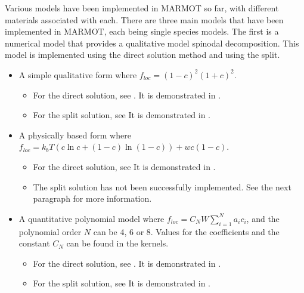 \documentclass[letter,12pt,fleqn]{article}
\begin{document}
Various models have been implemented in MARMOT so far, with different materials associated with each. There are three main models that have been implemented in MARMOT, each being single species models. The first is a numerical model that provides a qualitative model spinodal decomposition. This model is implemented using the direct solution method and using the split.  
\begin{itemize}
	\item A simple qualitative form where $f_{loc} = (1 - c)^2(1 + c)^2$.
	\begin{itemize}\sloppy
		\item For the direct solution, see . It is demonstrated in .
		\item For the split solution, see  It is demonstrated in .
	\end{itemize}
	\item A physically based form where $f_{loc} = k_b T(c\ln c + (1-c)\ln(1-c)) + w c (1-c)$.
	\begin{itemize}
		\item For the direct solution, see  It is demonstrated in .
		\item The split solution has not been successfully implemented. See the next paragraph for more information.
	\end{itemize}
	\item A quantitative polynomial model where $f_{loc} = C_N W \sum_{i=1}^N a_i c_i$, and the polynomial order $N$ can be 4, 6 or 8. Values for the coefficients and the constant $C_N$ can be found in the kernels.
	\begin{itemize}\sloppy
		\item For the direct solution, see . It is demonstrated in .
		\item For the split solution, see  It is demonstrated in .
	\end{itemize}
\end{itemize}
\end{document}
